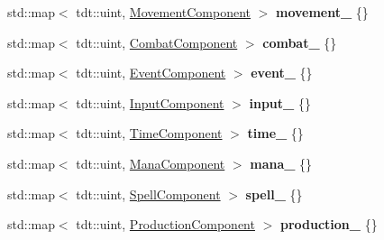 \begin{DoxyCompactItemize}
\item 
std\+::map$<$ tdt\+::uint, \hyperlink{struct_movement_component}{Movement\+Component} $>$ {\bfseries movement\+\_\+} \{\}\hypertarget{class_entity_system_a72aedf0d22c9eb94bee7a35a01f4932c}{}\label{class_entity_system_a72aedf0d22c9eb94bee7a35a01f4932c}

\item 
std\+::map$<$ tdt\+::uint, \hyperlink{struct_combat_component}{Combat\+Component} $>$ {\bfseries combat\+\_\+} \{\}\hypertarget{class_entity_system_a4ad5edb5ea5966b530758bfd7cbf97b7}{}\label{class_entity_system_a4ad5edb5ea5966b530758bfd7cbf97b7}

\item 
std\+::map$<$ tdt\+::uint, \hyperlink{struct_event_component}{Event\+Component} $>$ {\bfseries event\+\_\+} \{\}\hypertarget{class_entity_system_ae462dcb2ed02716e55ebe7daa30ddefe}{}\label{class_entity_system_ae462dcb2ed02716e55ebe7daa30ddefe}

\item 
std\+::map$<$ tdt\+::uint, \hyperlink{struct_input_component}{Input\+Component} $>$ {\bfseries input\+\_\+} \{\}\hypertarget{class_entity_system_a8b23771e0d57b94a0a9965b9bd962618}{}\label{class_entity_system_a8b23771e0d57b94a0a9965b9bd962618}

\item 
std\+::map$<$ tdt\+::uint, \hyperlink{struct_time_component}{Time\+Component} $>$ {\bfseries time\+\_\+} \{\}\hypertarget{class_entity_system_a2266bb5ccfc3e59dc6cedc2df9d9693f}{}\label{class_entity_system_a2266bb5ccfc3e59dc6cedc2df9d9693f}

\item 
std\+::map$<$ tdt\+::uint, \hyperlink{struct_mana_component}{Mana\+Component} $>$ {\bfseries mana\+\_\+} \{\}\hypertarget{class_entity_system_aaa627f7d263a935948dd478863361b0a}{}\label{class_entity_system_aaa627f7d263a935948dd478863361b0a}

\item 
std\+::map$<$ tdt\+::uint, \hyperlink{struct_spell_component}{Spell\+Component} $>$ {\bfseries spell\+\_\+} \{\}\hypertarget{class_entity_system_ace9c6990c0e158579e4ab9484579a640}{}\label{class_entity_system_ace9c6990c0e158579e4ab9484579a640}

\item 
std\+::map$<$ tdt\+::uint, \hyperlink{struct_production_component}{Production\+Component} $>$ {\bfseries production\+\_\+} \{\}\hypertarget{class_entity_system_aab0d0613a95df77125b0d80079e9a101}{}\label{class_entity_system_aab0d0613a95df77125b0d80079e9a101}


\end{DoxyCompactItemize}
